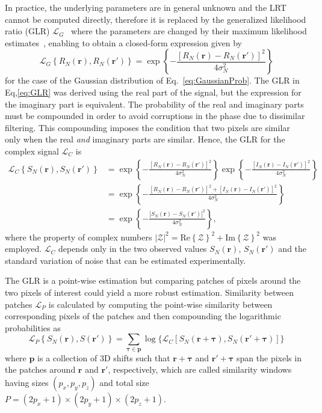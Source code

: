 In practice, the underlying parameters are in general unknown and the LRT cannot be computed directly, therefore it is replaced by the generalized likelihood ratio (GLR) $\mathcal{L}_G$~\cite{Cuartas-Velez2018_Volumetric} where the parameters are changed by their maximum likelihood estimates~\cite{Deledalle2012_How}, enabling to obtain a closed-form expression given by
\begin{equation}\label{eq:GLR}
    \mathcal{L}_G\left\{R_N(\bm{r}), R_N(\bm{r}')\right\} = \exp\left\{-\frac{[R_N(\bm{r}) - R_N(\bm{r}')]^2} {4\sigma_N^2}\right\}
\end{equation}
for the case of the Gaussian distribution of Eq.~\eqref{eq:GaussianProb}. The GLR in Eq,\eqref{eq:GLR} was derived using the real part of the signal, but the expression for the imaginary part is equivalent. The probability of the real and imaginary parts must be compounded in order to avoid corruptions in the phase due to dissimilar filtering. This compounding imposes the condition that two pixels are similar only when the real \textit{and} imaginary parts are similar. Hence, the GLR for the complex signal $\mathcal{L}_C$ is
\begin{align}\label{eq:GLR_total}
    \mathcal{L}_C\left\{S_N(\bm{r}), S_N(\bm{r}')\right\} &= \exp\left\{-\frac{[R_N(\bm{r}) - R_N(\bm{r}')]^2} {4\sigma_N^2}\right\} \exp\left\{-\frac{[I_N(\bm{r}) - I_N(\bm{r}')]^2} {4\sigma_N^2}\right\} \nonumber\\
    &=  \exp\left\{-\frac{[R_N(\bm{r}) - R_N(\bm{r}')]^2 + [I_N(\bm{r}) - I_N(\bm{r}')]^2} {4\sigma_N^2}\right\} \nonumber\\
    &= \exp\left\{-\frac{|S_N(\bm{r}) - S_N(\bm{r}')|^2} {4\sigma_N^2}\right\},
\end{align}
where the property of complex numbers $|\mathcal{Z}|^2 = \text{Re}\left\{\mathcal{Z}\right\}^2 + \text{Im}\left\{\mathcal{Z}\right\}^2$ was employed. $\mathcal{L}_C$ depends only in the two observed values $S_N(\bm{r})$, $S_N(\bm{r}')$ and the standard variation of noise that can be estimated experimentally. 

The GLR is a point-wise estimation but comparing patches of pixels around the two pixels of interest could yield a more robust estimation. Similarity between patches $\mathcal{L}_{P}$ is calculated by computing the point-wise similarity between corresponding pixels of the patches and then compounding the logarithmic probabilities as
\begin{equation}
    \mathcal{L}_{P}\left\{S_N(\bm{r}), S(\bm{r}')\right\} = \sum_{\bm{\tau}\in\bm{p}}\log\{\mathcal{L}_C[S_N(\bm{r}+\bm{\tau}), S_N(\bm{r}'+\bm{\tau})]\}
\end{equation}
where $\bm{p}$ is a collection of 3D shifts such that $\bm{r}+\bm{\tau}$ and $\bm{r}'+\bm{\tau}$ span the pixels in the patches around $\bm{r}$ and $\bm{r'}$, respectively, which are called similarity windows having sizes $(p_x, p_y, p_z)$ and total size $P=(2p_x+1)\times(2p_y+1)\times(2p_z+1)$.

